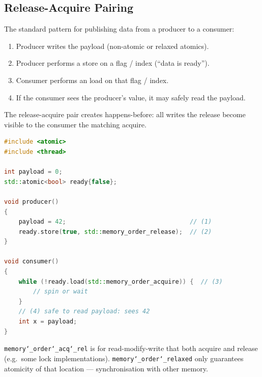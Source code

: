 \subsection{Release-Acquire Pairing}
\label{subsec:release-acquire-pairing}
The standard pattern for publishing data from a producer to a consumer:
\begin{enumerate}
    \item Producer writes the payload (non-atomic or relaxed atomics).
    \item Producer performs a  store on a flag / index (``data is ready'').
    \item Consumer performs an  load on that flag / index.
    \item If the consumer sees the producer's value, it may safely read the payload.
\end{enumerate}
The release-acquire pair creates happens-before: all writes  the release 
become visible to the consumer  the matching acquire.

\begin{lstlisting}[language=C++]
#include <atomic>
#include <thread>

int payload = 0;
std::atomic<bool> ready{false};

void producer()
{
    payload = 42;                                  // (1)
    ready.store(true, std::memory_order_release);  // (2)
}

void consumer()
{
    while (!ready.load(std::memory_order_acquire)) {  // (3)
        // spin or wait
    }
    // (4) safe to read payload: sees 42
    int x = payload;
}
\end{lstlisting}

\noindent
\texttt{memory\char`_order\char`_acq\char`_rel} is for read-modify-write that both acquire and release 
(e.g.\ some lock implementations). \texttt{memory\char`_order\char`_relaxed} only guarantees 
atomicity of that location ---  synchronisation with other memory.

